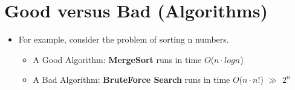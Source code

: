 \documentclass[12pt]{article}
\begin{document}
\section{Good versus Bad (Algorithms)}
\renewcommand{\labelitemii}{$\circ$}
\renewcommand{\labelitemiii}{$\cdot$}
\begin{itemize}
\item For example, consider the problem of sorting n numbers.
	\begin{itemize}
	\item A Good Algorithm: \textbf{MergeSort} runs in time $O$($n \cdot log{}n$)
	\item A Bad Algorithm: \textbf{BruteForce Search} runs in time $O$($n \cdot n!$) \(\gg\) $2^n$
	\end{itemize}
\end{itemize}
\end{document}
